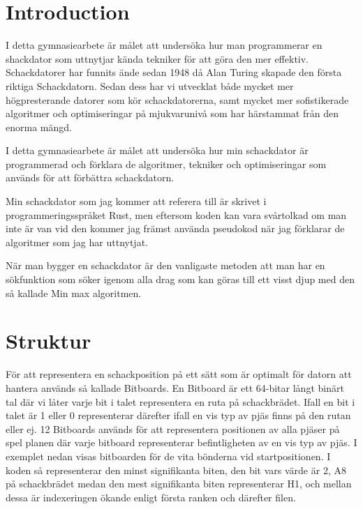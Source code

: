 \documentclass{article}
\title{}
\author{Vilhelm Lindell}
\date{August 2024}
\begin{document}
\maketitle
\section{Introduction}
I detta gymnasiearbete är målet att undersöka hur man programmerar en shackdator som uttnytjar kända tekniker för att göra den mer effektiv. Schackdatorer har funnits ände sedan 1948 då Alan Turing skapade den första riktiga Schackdatorn. Sedan dess har vi utvecklat både mycket mer högpresterande datorer som kör schackdatorerna, samt mycket mer sofistikerade algoritmer och optimiseringar på mjukvarunivå som har härstammat från den enorma mängd.

I detta gymnasiearbete är målet att undersöka hur min schackdator är programmerad och förklara de algoritmer, tekniker och optimiseringar som används för att förbättra schackdatorn.

Min schackdator som jag kommer att referera till är skrivet i programmeringsspråket Rust, men eftersom koden kan vara svårtolkad om man inte är van vid den kommer jag främst använda pseudokod när jag förklarar de algoritmer som jag har uttnytjat.

När man bygger en schackdator är den vanligaste metoden att man har en sökfunktion som söker igenom alla drag som kan göras till ett visst djup med den så kallade Min max algoritmen.

\section{Struktur}
För att representera en schackposition på ett sätt som är optimalt för datorn att hantera används så kallade Bitboards. En Bitboard är ett 64-bitar långt binärt tal där vi låter varje bit i talet representera en ruta på schackbrädet. Ifall en bit i talet är 1 eller 0 representerar därefter ifall en vis typ av pjäs finns på den rutan eller ej. 12 Bitboards används för att representera positionen av alla pjäser på spel planen där varje bitboard representerar befintligheten av en vis typ av pjäs. I exemplet nedan visas bitboarden för de vita bönderna vid startpositionen. I koden så representerar den minst signifikanta biten, den bit vars värde är 2, A8 på schackbrädet medan den mest signifikanta biten representerar H1, och mellan dessa är indexeringen ökande enligt första ranken och därefter filen.
\end{document}
